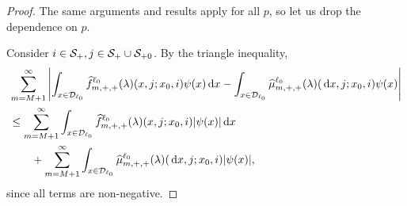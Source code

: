 \begin{proof}
	The same arguments and results apply for all \(p\), so let us drop the dependence on \(p\). 
	
	Consider \(i\in\mathcal{S}_+,j\in\mathcal S_+\cup\mathcal{S}_{+0}\). By the triangle inequality, 
	\begin{align*}
		&\sum_{m=M+1}^\infty \left| \int_{x\in\mathcal{D}_{\ell_0}} \widehat f^{\ell_0}_{m,+,+}(\lambda)(x,j;x_0,i)\psi(x) \, \mathrm{d} x
		-
		 \int_{x\in\mathcal{D}_{\ell_0}} \widehat \mu^{\ell_0}_{m,+,+}(\lambda)(\, \mathrm{d} x,j;x_0,i) \psi(x) \right|
		\\&\leq\sum_{m=M+1}^\infty \int_{x\in\mathcal{D}_{\ell_0}} \widehat f^{\ell_0}_{m,+,+}(\lambda)(x,j;x_0,i) |\psi(x)| \, \mathrm{d} x
		\\&\qquad{} +\sum_{m=M+1}^\infty \int_{x\in\mathcal{D}_{\ell_0}} \widehat  \mu^{\ell_0}_{m,+,+}(\lambda)(\, \mathrm{d} x,j;x_0,i) |\psi(x)|,
	\end{align*}
	since all terms are non-negative. 
	

\end{proof}
